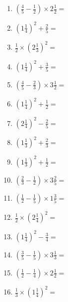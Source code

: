 \documentclass[12pt]{article}
\begin{document}
\begin{enumerate}
\item \large $ \left( \frac{4}{5} - \frac{1}{2} \right) \times 2 \frac{1}{2} = $ \vspace{1.6cm}
\item \large $ \left( 1 \frac{1}{4} \right)^2 + \frac{2}{5} = $ \vspace{1.6cm}
\item \large $ \frac{1}{2} \times \left( 2 \frac{1}{3} \right)^2 = $ \vspace{1.6cm}
\item \large $ \left( 1 \frac{1}{4} \right)^2 + \frac{3}{5} = $ \vspace{1.6cm}
\item \large $ \left( \frac{4}{5} - \frac{2}{3} \right) \times 3 \frac{1}{2} = $ \vspace{1.6cm}
\item \large $ \left( 1 \frac{1}{4} \right)^2 + \frac{1}{2} = $ \vspace{1.6cm}
\item \large $ \left( 2 \frac{1}{4} \right)^2 - \frac{2}{5} = $ \vspace{1.6cm}
\item \large $ \left( 1 \frac{1}{3} \right)^2 + \frac{2}{3} = $ \vspace{1.6cm}
\item \large $ \left( 1 \frac{1}{3} \right)^2 + \frac{1}{2} = $ \vspace{1.6cm}
\item \large $ \left( \frac{2}{3} - \frac{1}{2} \right) \times 3 \frac{2}{5} = $ \vspace{1.6cm}
\newpage
\item \large $ \left( \frac{1}{2} - \frac{1}{5} \right) \times 1 \frac{3}{5} = $ \vspace{1.6cm}
\item \large $ \frac{1}{2} \times \left( 2 \frac{1}{4} \right)^2 = $ \vspace{1.6cm}
\item \large $ \left( 1 \frac{1}{4} \right)^2 - \frac{3}{4} = $ \vspace{1.6cm}
\item \large $ \left( \frac{3}{5} - \frac{1}{5} \right) \times 3 \frac{1}{3} = $ \vspace{1.6cm}
\item \large $ \left( \frac{1}{2} - \frac{1}{4} \right) \times 2 \frac{1}{2} = $ \vspace{1.6cm}
\item \large $ \frac{1}{3} \times \left( 1 \frac{1}{4} \right)^2 = $ \vspace{1.6cm}

\end{enumerate}
\end{document}
